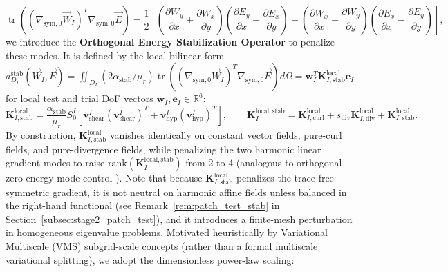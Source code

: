 \documentclass[VANCOUVER]{USG}
\begin{document}
\begin{equation}
    \operatorname{tr}\!\left((\nabla_{\mathrm{sym},0}\vec{W}_I)^T \nabla_{\mathrm{sym},0}\vec{E}\right) = \frac{1}{2}\left[\left(\frac{\partial W_y}{\partial x} + \frac{\partial W_x}{\partial y}\right)\left(\frac{\partial E_y}{\partial x} + \frac{\partial E_x}{\partial y}\right) + \left(\frac{\partial W_x}{\partial x} - \frac{\partial W_y}{\partial y}\right)\left(\frac{\partial E_x}{\partial x} - \frac{\partial E_y}{\partial y}\right)\right],
    \label{eq:dev_trace_identity}
\end{equation}
we introduce the \textbf{Orthogonal Energy Stabilization Operator} to penalize these modes. It is defined by the local bilinear form $a_{D_I}^{\mathrm{stab}}(\vec{W}_I, \vec{E}) = \iint_{D_I} (2\alpha_{\mathrm{stab}}/\mu_r) \operatorname{tr}\!\left((\nabla_{\mathrm{sym},0}\vec{W}_I)^T \nabla_{\mathrm{sym},0}\vec{E}\right) d\Omega = \mathbf{w}_I^T \mathbf{K}_{I, \mathrm{stab}}^{\mathrm{local}} \mathbf{e}_I$ for local test and trial DoF vectors $\mathbf{w}_I, \mathbf{e}_I \in \mathbb{R}^6$:
\begin{equation}
    \mathbf{K}_{I, \mathrm{stab}}^{\mathrm{local}} = \frac{\alpha_{\mathrm{stab}}}{\mu_r} S_0^I \left[ \mathbf{v}_{\mathrm{shear}}^I (\mathbf{v}_{\mathrm{shear}}^I)^T + \mathbf{v}_{\mathrm{hyp}}^I (\mathbf{v}_{\mathrm{hyp}}^I)^T \right], \qquad
    \mathbf{K}_I^{\mathrm{local, stab}} = \mathbf{K}_{I, \mathrm{curl}}^{\mathrm{local}} + s_{\mathrm{div}}\mathbf{K}_{I, \mathrm{div}}^{\mathrm{local}} + \mathbf{K}_{I, \mathrm{stab}}^{\mathrm{local}}.
    \label{eq:k_stab_analytic}
\end{equation}
By construction, $\mathbf{K}_{I, \mathrm{stab}}^{\mathrm{local}}$ vanishes identically on constant vector fields, pure-curl fields, and pure-divergence fields, while penalizing the two harmonic linear gradient modes to raise $\mathrm{rank}(\mathbf{K}_I^{\mathrm{local, stab}})$ from 2 to 4 (analogous to orthogonal zero-energy mode control \cite{flanagan1981uniform}). Note that because $\mathbf{K}_{I, \mathrm{stab}}^{\mathrm{local}}$ penalizes the trace-free symmetric gradient, it is not neutral on harmonic affine fields unless balanced in the right-hand functional (see Remark~\ref{rem:patch_test_stab} in Section~\ref{subsec:stage2_patch_test}), and it introduces a finite-mesh perturbation in homogeneous eigenvalue problems. Motivated heuristically by Variational Multiscale (VMS) subgrid-scale concepts \cite{hughes1998variational, codina2000stabilization} (rather than a formal multiscale variational splitting), we adopt the dimensionless power-law scaling:
\end{document}
